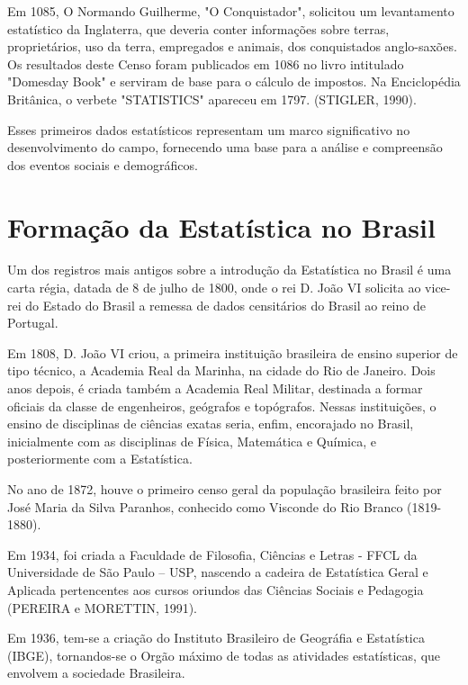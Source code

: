 Em 1085, O Normando Guilherme, "O Conquistador",
solicitou um levantamento estatístico da Inglaterra, que deveria
conter informações sobre terras, proprietários, uso da terra,
empregados e animais, dos conquistados anglo-saxões. Os resultados
deste Censo foram publicados em 1086 no livro intitulado "Domesday
Book" e serviram de base para o cálculo de impostos. Na Enciclopédia Britânica, o verbete "STATISTICS" apareceu em 1797. (STIGLER, 1990).\vskip0.3cm

Esses primeiros dados estatísticos representam um marco significativo no desenvolvimento do campo, fornecendo uma base para a análise e compreensão dos eventos sociais e demográficos.


 
\section{Formação da Estatística no Brasil}

\inic Um dos registros mais antigos sobre a introdução da Estatística no Brasil é uma
carta régia, datada de 8 de julho de 1800, onde o rei D. João VI solicita ao vice-rei do
Estado do Brasil a remessa de dados censitários do Brasil ao reino de Portugal.\vskip0.3cm


\inic Em 1808, D. João VI criou, a primeira instituição brasileira de ensino superior de tipo técnico, a Academia Real da Marinha, na cidade do Rio de Janeiro. Dois anos depois, é criada também a Academia Real Militar, destinada a formar oficiais da classe de engenheiros, geógrafos e
topógrafos. Nessas instituições, o ensino de disciplinas de ciências exatas seria, enfim,
encorajado no Brasil, inicialmente com as disciplinas de Física, Matemática e Química,
e posteriormente com a Estatística.\vskip0.3cm


\inic No ano de 1872, houve o primeiro censo geral da população
brasileira feito por José Maria da Silva Paranhos, conhecido como
Visconde do Rio Branco (1819-1880).\vskip0.3cm 


\inic Em 1934, foi criada a Faculdade de Filosofia, Ciências e Letras - FFCL da Universidade de São Paulo – USP, nascendo a cadeira de Estatística Geral e Aplicada pertencentes aos cursos oriundos das Ciências Sociais e Pedagogia (PEREIRA e MORETTIN, 1991).\vskip0.3cm

\inic Em 1936, tem-se a criação do Instituto Brasileiro de Geográfia e Estatística (IBGE), tornandos-se o Orgão máximo de todas as atividades estatísticas, que envolvem a sociedade Brasileira.\vskip0.3cm

